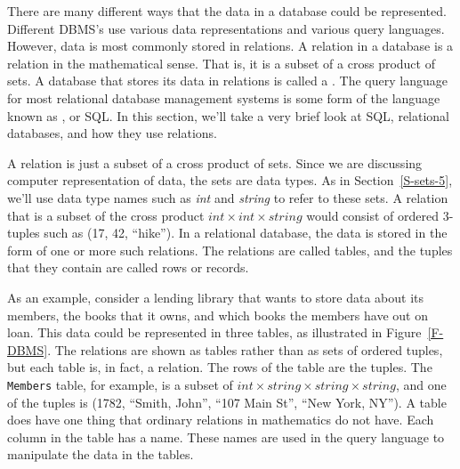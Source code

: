 There are many different ways that the data in a database could
be represented.  Different DBMS's use various data representations
and various query languages.  However, data is most commonly stored
in relations.  A relation in a database is a relation
in the mathematical sense.
That is, it is a subset of a cross product of sets.  A database
that stores its data in relations is called a .  The query language for most relational database management
systems is some form of the language known as , or SQL.  In this section, we'll take a very brief look
at SQL, relational databases, and how they use relations.

\medbreak

A relation is just a subset of a cross product of sets.  Since we
are discussing computer representation of data, the sets are
data types.  As in Section~\ref{S-sets-5}, we'll use data
type names such as \textit{int} and \textit{string} to refer to
these sets.  A relation that is a subset of the
cross product $\textit{int}\times\textit{int}\times\textit{string}$
would consist of ordered 3-tuples such as 
(17, 42, ``hike'').  In a relational database, the data is stored in
the form of one or more such relations.  The relations are called
tables, and the tuples that they contain are called rows or records.

As an example, consider a lending library that wants to
store data about its members, the books that it owns, and
which books the members have out on loan.
This data could be represented in three tables, as illustrated in
Figure~\ref{F-DBMS}.  The relations are shown as tables rather than
as sets of ordered tuples, but each table is, in fact, a relation.
The rows of the table are the tuples.  The \texttt{Members} table,
for example, is a subset of $\textit{int}\times\textit{string}\times\textit{string}\times\textit{string}$,
and one of the tuples is (1782, ``Smith, John'', ``107 Main St'', ``New York, NY'').
A table does have one thing that ordinary relations in mathematics
do not have.  Each column in the table has a name.  These names
are used in the query language to manipulate the data in the tables.

